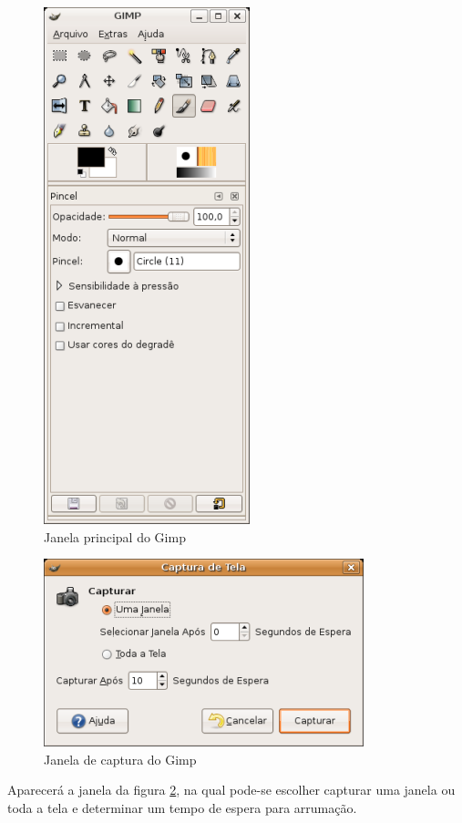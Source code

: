 \documentclass[12pt,brazil]{book}
\begin{document}
\begin{figure}[!h]
  \centering
  \includegraphics[scale=.7]{gimp-screen}
  \caption{Janela principal do Gimp}
  \label{fig:janela-gimp}
\end{figure}

\begin{figure}[!h]
  \centering
    \includegraphics[scale=.7]{captura-gimp-screen}
    \caption{Janela de captura do Gimp}
    \label{fig:captura-gimp}
\end{figure}

Aparecerá a janela da figura \ref{fig:captura-gimp}, na qual pode-se
escolher capturar uma janela ou toda a tela e determinar um tempo de
espera para arrumação.
\end{document}
